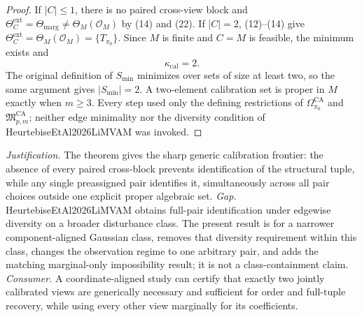 \documentclass{article}
\begin{document}
\begin{proof}
If \(|C|\le1\), there is no paired cross-view block and \(\Theta_C^{\mathrm{ext}}=\Theta_{\mathrm{marg}}\ne\Theta_M(\mathcal O_M)\) by (14) and (22).  If \(|C|=2\), (12)--(14) give \(\Theta_C^{\mathrm{ext}}=\Theta_M(\mathcal O_M)=\{T_{\pi_0}\}\).  Since \(M\) is finite and \(C=M\) is feasible, the minimum exists and
\[
\kappa_{\mathrm{cal}}=2.
\tag{23}
\]
The original definition of \(S_{\min}\) minimizes over sets of size at least two, so the same argument gives \(|S_{\min}|=2\).  A two-element calibration set is proper in \(M\) exactly when \(m\ge3\).  Every step used only the defining restrictions of \(\Omega_{\pi_0}^{\mathrm{CA}}\) and \(\mathfrak M_{p,m}^{\mathrm{CA}}\); neither edge minimality nor the diversity condition of HeurtebiseEtAl2026LiMVAM was invoked.
\end{proof}
\par\smallskip\noindent \textit{Justification.} The theorem gives the sharp generic calibration frontier: the absence of every paired cross-block prevents identification of the structural tuple, while any single preassigned pair identifies it, simultaneously across all pair choices outside one explicit proper algebraic set. \textit{Gap.} HeurtebiseEtAl2026LiMVAM obtains full-pair identification under edgewise diversity on a broader disturbance class. The present result is for a narrower component-aligned Gaussian class, removes that diversity requirement within this class, changes the observation regime to one arbitrary pair, and adds the matching marginal-only impossibility result; it is not a class-containment claim. \textit{Consumer.} A coordinate-aligned study can certify that exactly two jointly calibrated views are generically necessary and sufficient for order and full-tuple recovery, while using every other view marginally for its coefficients.
\end{document}
